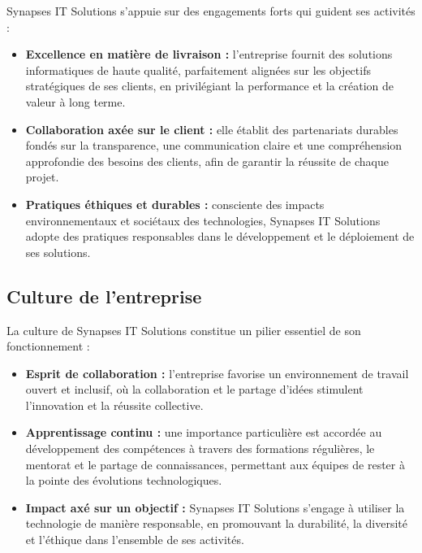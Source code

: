 \documentclass[12pt,a4paper]{report}
\begin{document}
Synapses IT Solutions s'appuie sur des engagements forts qui guident ses activités :

\begin{itemize}
    \item \textbf{Excellence en matière de livraison :} l'entreprise fournit des solutions informatiques de haute qualité, parfaitement alignées sur les objectifs stratégiques de ses clients, en privilégiant la performance et la création de valeur à long terme.

    \item \textbf{Collaboration axée sur le client :} elle établit des partenariats durables fondés sur la transparence, une communication claire et une compréhension approfondie des besoins des clients, afin de garantir la réussite de chaque projet.

    \item \textbf{Pratiques éthiques et durables :} consciente des impacts environnementaux et sociétaux des technologies, Synapses IT Solutions adopte des pratiques responsables dans le développement et le déploiement de ses solutions.
\end{itemize}

\subsection{Culture de l'entreprise}

La culture de Synapses IT Solutions constitue un pilier essentiel de son fonctionnement :

\begin{itemize}
    \item \textbf{Esprit de collaboration :} l'entreprise favorise un environnement de travail ouvert et inclusif, où la collaboration et le partage d'idées stimulent l'innovation et la réussite collective.

    \item \textbf{Apprentissage continu :} une importance particulière est accordée au développement des compétences à travers des formations régulières, le mentorat et le partage de connaissances, permettant aux équipes de rester à la pointe des évolutions technologiques.

    \item \textbf{Impact axé sur un objectif :} Synapses IT Solutions s'engage à utiliser la technologie de manière responsable, en promouvant la durabilité, la diversité et l'éthique dans l'ensemble de ses activités.
\end{itemize}
\end{document}
